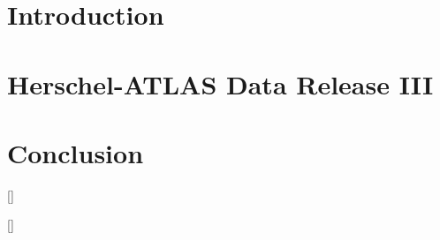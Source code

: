 \documentclass[a4paper,12pt,twoside,openright,dalthesis]{report}
\begin{document}
\chapter{Introduction}
\label{chapter:Introduction}


\chapter{Herschel-ATLAS Data Release III}
\label{chapter:Data_Release_3}


\chapter{Conclusion}
\label{chapter:Conclusion}


\appendix


[\titlerule\vspace{2pt}\titlerule]



\titleformat{\chapter}[display]{}{}{0pt}{\huge \textbf \textsc}[\titlerule\vspace{2pt}\titlerule]
%





\end{document}
